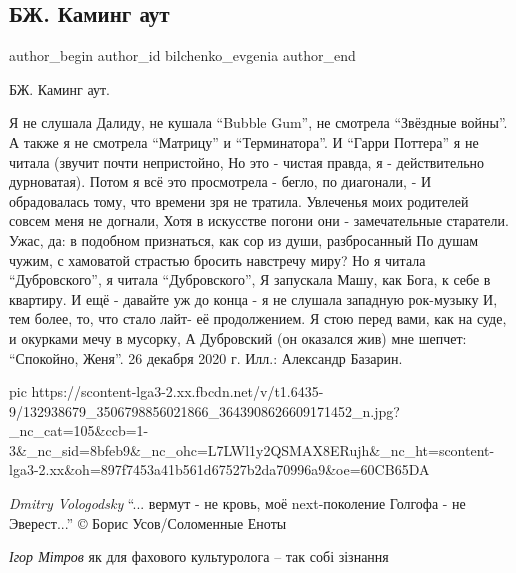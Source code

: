  
 
 
 
 
 
\subsection{БЖ. Каминг аут}
\label{sec:27_12_2020.fb.bilchenko_evgenia.6.kaming_aut}
\ifcmt
 author_begin
   author_id bilchenko_evgenia
 author_end
\fi

БЖ. Каминг аут.

Я не слушала Далиду, не кушала \enquote{Bubble Gum}, не смотрела \enquote{Звёздные войны}.
А также я не смотрела \enquote{Матрицу} и \enquote{Терминатора}.
И \enquote{Гарри Поттера} я не читала (звучит почти непристойно,
Но это - чистая правда, я - действительно дурноватая).
Потом я всё это просмотрела - бегло, по диагонали, -
И обрадовалась тому, что времени зря не тратила.
Увлеченья моих родителей совсем меня не догнали,
Хотя в искусстве погони они - замечательные старатели.
Ужас, да: в подобном признаться, как сор из души, разбросанный
По душам чужим, с хамоватой страстью бросить навстречу миру?
Но я читала \enquote{Дубровского}, я читала \enquote{Дубровского},
Я запускала Машу, как Бога, к себе в квартиру.
И ещё - давайте уж до конца - я не слушала западную рок-музыку
И, тем более, то, что стало лайт- её продолжением.
Я стою перед вами, как на суде, и окурками мечу в мусорку,
А Дубровский (он оказался жив) мне шепчет: \enquote{Спокойно, Женя}.
26 декабря 2020 г.
Илл.: Александр Базарин.

\ifcmt
  pic https://scontent-lga3-2.xx.fbcdn.net/v/t1.6435-9/132938679_3506798856021866_3643908626609171452_n.jpg?_nc_cat=105&ccb=1-3&_nc_sid=8bfeb9&_nc_ohc=L7LWl1y2QSMAX8ERujh&_nc_ht=scontent-lga3-2.xx&oh=897f7453a41b561d67527b2da70996a9&oe=60CB65DA
\fi

\emph{Dmitry Vologodsky}
\enquote{... вермут - не кровь, моё next-поколение
Голгофа - не Эверест...}
© Борис Усов/Соломенные Еноты

\emph{Ігор Мітров}
як для фахового культуролога – так собі зізнання

